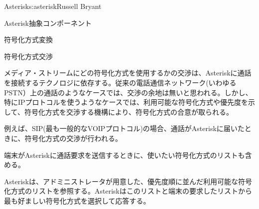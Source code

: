 \begin{aosachapter}{Asterisk}{s:asterisk}{Russell Bryant}
\begin{aosasect1}{Asterisk抽象コンポーネント}
\begin{aosasect2}{符号化方式変換}
\begin{aosabox}{符号化方式交渉}

メディア・ストリームにどの符号化方式を使用するかの交渉は、Asteriskに通話を接続するテクノロジに依存する。従来の電話通信ネットワーク(いわゆるPSTN）上の通話のようなケースでは、交渉の余地は無いと思われる。しかし、特にIPプロトコルを使うようなケースでは、利用可能な符号化方式や優先度を示して、符号化方式を交渉する機構により、符号化方式の合意が取られる。

例えば、SIP(最も一般的なVOIPプロトコル)の場合、通話がAsteriskに届いたときに、符号化方式の交渉が行われる。

\begin{aosaenumerate}

  \item 端末がAsteriskに通話要求を送信するときに、使いたい符号化方式のリストも含める。

  \item Asteriskは、アドミニストレータが用意した、優先度順に並んだ利用可能な符号化方式のリストを参照する。Asteriskはこのリストと端末の要求したリストから最も好ましい符号化方式を選択して応答する。

\end{aosaenumerate}


\end{aosabox}
\end{aosasect2}
\end{aosasect1}
\end{aosachapter}
